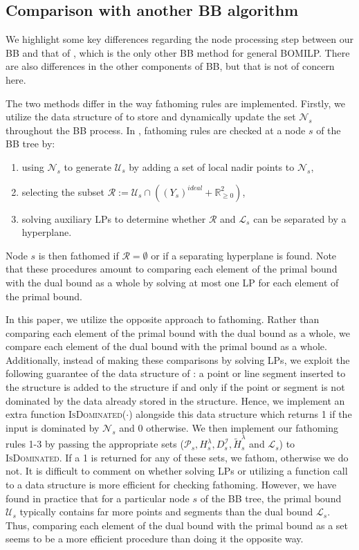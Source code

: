 \documentclass[11.5pt]{article}
\newcommand{\bb}{BB}
\newcommand{\R}{\mathbb{R}}
\newcommand{\U}{\mathcal{U}}
\renewcommand{\L}{\mathcal{L}}
\newcommand{\N}{\mathcal{N}}
\newcommand{\nonneg}{\R^{2}_{\ge 0}}
\begin{document}
\subsection{Comparison with another \bb{} algorithm} \label{sec:compare}
We highlight some key differences regarding the node processing step between our \bb{} and that of \citet{belotti2012biobjective,belotti2016fathoming}, which is the only other \bb{} method for general BOMILP. There are also differences in the other components of \bb{}, %
but that is not of concern here.

The two methods differ in the way fathoming rules are implemented. Firstly, we utilize the data structure of \citet{treestructure} to store and dynamically update the set $\N_s$ throughout the BB process. In \citep{belotti2012biobjective,belotti2016fathoming}, fathoming rules are checked at a node $s$ of the BB tree by: 
\begin{enumerate}
\item using $\N_s$ to generate $\U_s$ by adding a set of local nadir points to $\N_s$, 
\item selecting the  subset $\mathcal{R} := \U_{s}\cap ((Y_s)^{ideal} + \nonneg)$,
\item solving auxiliary LPs to determine whether $\mathcal{R}$ and $\L_{s}$ can be separated by a hyperplane.
\end{enumerate}
Node $s$ is then fathomed if $\mathcal{R} = \emptyset$ or if a separating hyperplane is found. Note that these procedures amount to comparing each element of the primal bound with the dual bound as a whole by solving at most one LP for each element of the primal bound.

In this paper, we utilize the opposite approach to fathoming. Rather than comparing each element of the primal bound with the dual bound as a whole, we compare each element of the dual bound with the primal bound as a whole. Additionally, instead of making these comparisons by solving LPs, we exploit the following guarantee of the data structure of \citep{treestructure}: a point or line segment inserted to the structure is added to the structure if and only if the point or segment is not dominated by the data already stored in the structure. Hence, we implement an extra function \textsc{IsDominated}($\cdot$) alongside this data structure which returns 1 if the input is dominated by $\N_s$ and 0 otherwise. We then implement our fathoming rules 1-3 by passing the appropriate sets ($\mathcal{P}_s, H_s^\lambda, D_s^\mathcal{I}, \tilde{H}_s^\lambda$ and $\L_s$) to \textsc{IsDominated}. If a 1 is returned for any of these sets, we fathom, otherwise we do not. It is difficult to comment on whether solving LPs or utilizing a function call to a data structure is more efficient for checking fathoming. However, we have found in practice that for a particular node $s$ of the BB tree, the primal bound $\U_s$ typically contains far more points and segments than the dual bound $\L_s$. Thus, comparing each element of the dual bound with the primal bound as a set seems to be a more efficient procedure than doing it the opposite way.
\end{document}
